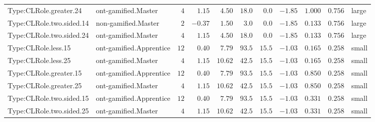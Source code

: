 \documentclass[6pt,a4paper]{article}
\begin{document}
{\begin{longtable}{llrrrrrrrrl}
Type:CLRole.greater.24&ont-gamified.Master&$ 4$&$ 1.15$&$ 4.50$&$ 18.0$&$ 0.0$&$-1.85$&$1.000$&$0.756$&large\tabularnewline
Type:CLRole.two.sided.14&non-gamified.Master&$ 2$&$-0.37$&$ 1.50$&$  3.0$&$ 0.0$&$-1.85$&$0.133$&$0.756$&large\tabularnewline
Type:CLRole.two.sided.24&ont-gamified.Master&$ 4$&$ 1.15$&$ 4.50$&$ 18.0$&$ 0.0$&$-1.85$&$0.133$&$0.756$&large\tabularnewline
Type:CLRole.less.15&ont-gamified.Apprentice&$12$&$ 0.40$&$ 7.79$&$ 93.5$&$15.5$&$-1.03$&$0.165$&$0.258$&small\tabularnewline
Type:CLRole.less.25&ont-gamified.Master&$ 4$&$ 1.15$&$10.62$&$ 42.5$&$15.5$&$-1.03$&$0.165$&$0.258$&small\tabularnewline
Type:CLRole.greater.15&ont-gamified.Apprentice&$12$&$ 0.40$&$ 7.79$&$ 93.5$&$15.5$&$-1.03$&$0.850$&$0.258$&small\tabularnewline
Type:CLRole.greater.25&ont-gamified.Master&$ 4$&$ 1.15$&$10.62$&$ 42.5$&$15.5$&$-1.03$&$0.850$&$0.258$&small\tabularnewline
\newpage
Type:CLRole.two.sided.15&ont-gamified.Apprentice&$12$&$ 0.40$&$ 7.79$&$ 93.5$&$15.5$&$-1.03$&$0.331$&$0.258$&small\tabularnewline
Type:CLRole.two.sided.25&ont-gamified.Master&$ 4$&$ 1.15$&$10.62$&$ 42.5$&$15.5$&$-1.03$&$0.331$&$0.258$&small\tabularnewline
\hline
\end{longtable}}
\end{document}
